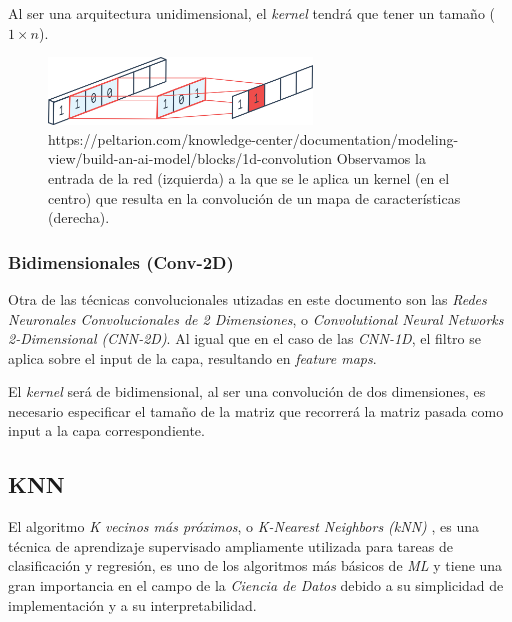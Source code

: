                 Al ser una arquitectura unidimensional, el \textit{kernel} tendrá que tener un tamaño ($1 \times n$).

                \begin{figure}[h]
                    \centering
                    \includegraphics[width=7cm]{archivos/CNN/1D/1DConvolution}
                    \caption{https://peltarion.com/knowledge-center/documentation/modeling-view/build-an-ai-model/blocks/1d-convolution Observamos la entrada de la red (izquierda) a la que se le aplica un kernel (en el centro) que resulta en la convolución de un mapa de características (derecha).}
                    \label{1DConvolutionImage}
                \end{figure}

                
            \subsubsection {Bidimensionales (Conv-2D)}
                Otra de las técnicas convolucionales utizadas en este documento son las \textit{Redes Neuronales Convolucionales de 2 Dimensiones}, o \textit{Convolutional Neural Networks 2-Dimensional (CNN-2D)}. Al igual que en el caso de las \textit{CNN-1D}, el filtro se aplica sobre el input de la capa, resultando en \textit{feature maps}.

                El \textit{kernel} será de bidimensional, al ser una convolución de dos dimensiones, es necesario especificar el tamaño de la matriz que recorrerá la matriz pasada como input a la capa correspondiente.

                \textit{}

        \subsection {KNN}

            El algoritmo \textit{K vecinos más próximos}, o \textit{K-Nearest Neighbors (kNN)} \cite{KNN}, es una técnica de aprendizaje supervisado ampliamente utilizada para tareas de clasificación y regresión, es uno de los algoritmos más básicos de \textit{ML} y tiene una gran importancia en el campo de la \textit{Ciencia de Datos} debido a su simplicidad de implementación y a su interpretabilidad.

